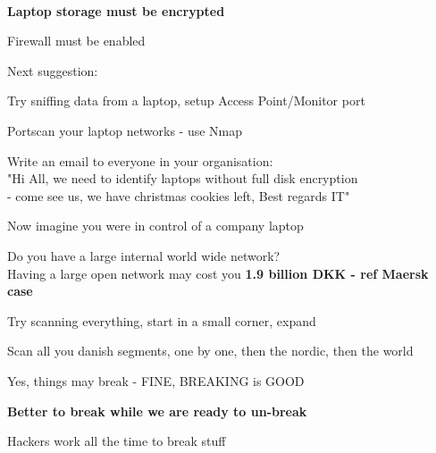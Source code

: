 \documentclass[Screen16to9,17pt]{foils}
\begin{document}

{~}
\begin{list1}
\item {\bf Laptop storage must be encrypted}
\item Firewall must be enabled
\item Next suggestion:
\begin{list2}
\item Try sniffing data from a laptop, setup Access Point/Monitor port
\item Portscan your laptop networks - use Nmap
\item Write an email to everyone in your organisation:\\
"Hi All, we need to identify laptops without full disk encryption \\
- come see us, we have christmas cookies left, Best regards IT"
\end{list2}
\end{list1}






\begin{list2}
\item Now imagine you were in control of a company laptop
\item Do you have a large internal world wide network?\\
Having a large open network may cost you {\bf 1.9 billion DKK - ref Maersk case}
\item Try scanning everything, start in a small corner, expand
\item Scan all you danish segments, one by one, then the nordic, then the world
\item Yes, things may break - FINE, BREAKING is GOOD
\end{list2}

\centerline{\bf Better to break while we are ready to un-break}






Hackers work all the time to break stuff
\end{document}
